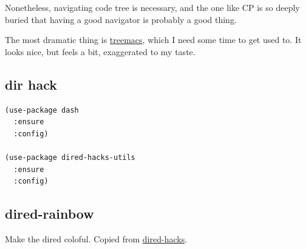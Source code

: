 \documentclass[11pt]{article}
\begin{document}
Nonetheless, navigating code tree is necessary, and the one like CP is
so deeply buried that having a good navigator is probably a good
thing.

The most dramatic thing is \hyperref[sec:org090dfeb]{treemacs}, which I need some time to get
used to. It looks nice, but feels a bit, exaggerated to my taste.

\subsection{dir hack}
\label{sec:orgc4825c9}
\begin{verbatim}
(use-package dash
  :ensure
  :config)

(use-package dired-hacks-utils
  :ensure
  :config)
\end{verbatim}
\subsection{dired-rainbow}
\label{sec:orge13eb4a}

Make the dired coloful. Copied from \href{https://github.com/Fuco1/dired-hacks}{dired-hacks}.
\end{document}
